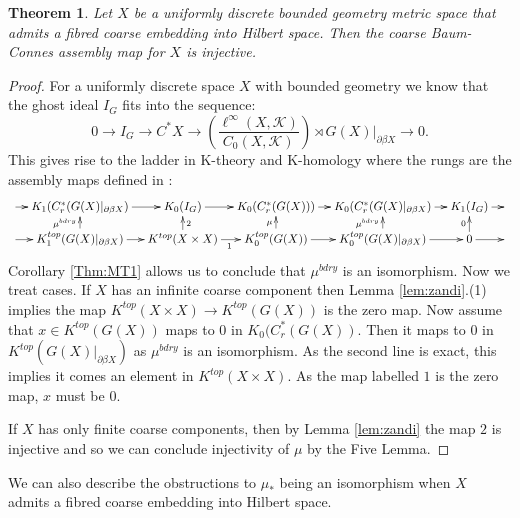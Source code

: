 \documentclass[11pt]{amsart}
\theoremstyle{plain}
\newtheorem{theorem}{Theorem}%
\theoremstyle{definition}%
\theoremstyle{remark}%
\begin{document}
{\begin{theorem}\label{thm:mcor1}
Let $X$ be a uniformly discrete bounded geometry metric space that admits a fibred coarse embedding into Hilbert space. Then the coarse Baum-Connes assembly map for $X$ is injective.
\end{theorem}
\begin{proof}
For a uniformly discrete space $X$ with bounded geometry we know that the ghost ideal $I_{G}$ fits into the sequence:
\begin{equation*}
0 \rightarrow I_{G} \rightarrow C^{*}X \rightarrow (\frac{\ell^{\infty}(X,\mathcal{K})}{C_{0}(X,\mathcal{K})})\rtimes G(X)|_{\partial\beta X} \rightarrow 0.
\end{equation*}
This gives rise to the ladder in K-theory and K-homology where the rungs are the assembly maps defined in \cite{mypub1}:
$$
\xymatrix@=1em{
\ar[r] & K_{1}(C^{*}_{r}(G(X)|_{\partial\beta X}) \ar[r] & K_{0}(I_{G}) \ar[r]& K_{0}(C^{*}_{r}(G(X))) \ar[r]& K_{0}(C^{*}_{r}(G(X)|_{\partial\beta X})\ar[r] & K_{1}(I_{G}) \ar[r] & \\
\ar[r] & K_{1}^{top}(G(X)|_{\partial\beta X}) \ar[r] \ar[u]^{\mu^{bdry}}& K^{top}(X \times X) \ar[r]_{1}\ar[u]_{2}& K_{0}^{top}(G(X)) \ar[r]\ar[u]^{\mu}& K_{0}^{top}(G(X)|_{\partial\beta X}) \ar[r]\ar[u]^{\mu^{bdry}}& 0\ar[u]^{0} \ar[r] &
}
$$
Corollary \ref{Thm:MT1} allows us to conclude that $\mu^{bdry}$ is an isomorphism. Now we treat cases. If $X$ has an infinite coarse component then Lemma \ref{lem:zandi}.(1) implies the map $K^{top}(X\times X) \rightarrow K^{top}(G(X))$ is the zero map. Now assume that $x \in K^{top}(G(X))$ maps to $0$ in $K_{0}(C^{*}_{r}(G(X))$. Then it maps to $0$ in $K^{top}(G(X)|_{\partial\beta X})$ as $\mu^{bdry}$ is an isomorphism. As the second line is exact, this implies it comes an element in $K^{top}(X\times X)$. As the map labelled $1$ is the zero map, $x$ must be $0$.

If $X$ has only finite coarse components, then by Lemma \ref{lem:zandi} the map $2$ is injective and so we can conclude injectivity of $\mu$ by the Five Lemma.
\end{proof}

We can also describe the obstructions to $\mu_{*}$ being an isomorphism when $X$ admits a fibred coarse embedding into Hilbert space.

}
\end{document}

